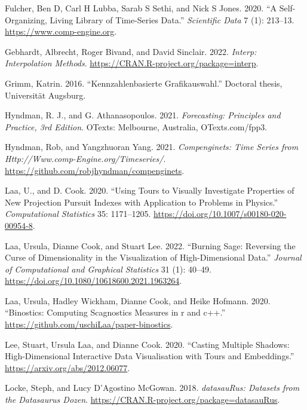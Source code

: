 \begin{CSLReferences}{1}{0}
\leavevmode{}%
Fulcher, Ben D, Carl H Lubba, Sarab S Sethi, and Nick S Jones. 2020. {``A Self-Organizing, Living Library of Time-Series Data.''} \emph{Scientific Data} 7 (1): 213--13. \url{https://www.comp-engine.org}.

\leavevmode{}%
Gebhardt, Albrecht, Roger Bivand, and David Sinclair. 2022. \emph{Interp: Interpolation Methods}. \url{https://CRAN.R-project.org/package=interp}.

\leavevmode{}%
Grimm, Katrin. 2016. {``Kennzahlenbasierte Grafikauswahl.''} Doctoral thesis, Universit{ä}t Augsburg.

\leavevmode{}%
Hyndman, R. J., and G. Athanasopoulos. 2021. \emph{Forecasting: Principles and Practice, 3rd Edition}. OTexts: Melbourne, Australia, OTexts.com/fpp3.

\leavevmode{}%
Hyndman, Rob, and Yangzhuoran Yang. 2021. \emph{Compenginets: Time Series from Http://Www.comp-Engine.org/Timeseries/}. \url{https://github.com/robjhyndman/compenginets}.

\leavevmode{}%
Laa, U., and D. Cook. 2020. {``Using Tours to Visually Investigate Properties of New Projection Pursuit Indexes with Application to Problems in Physics.''} \emph{Computational Statistics} 35: 1171--1205. \url{https://doi.org/10.1007/s00180-020-00954-8}.

\leavevmode{}%
Laa, Ursula, Dianne Cook, and Stuart Lee. 2022. {``Burning Sage: Reversing the Curse of Dimensionality in the Visualization of High-Dimensional Data.''} \emph{Journal of Computational and Graphical Statistics} 31 (1): 40--49. \url{https://doi.org/10.1080/10618600.2021.1963264}.

\leavevmode{}%
Laa, Ursula, Hadley Wickham, Dianne Cook, and Heike Hofmann. 2020. {``Binostics: Computing Scagnostics Measures in r and c++.''} \url{https://github.com/uschiLaa/paper-binostics}.

\leavevmode{}%
Lee, Stuart, Ursula Laa, and Dianne Cook. 2020. {``Casting Multiple Shadows: High-Dimensional Interactive Data Visualisation with Tours and Embeddings.''} \url{https://arxiv.org/abs/2012.06077}.

\leavevmode{}%
Locke, Steph, and Lucy D'Agostino McGowan. 2018. \emph{datasauRus: Datasets from the Datasaurus Dozen}. \url{https://CRAN.R-project.org/package=datasauRus}.


\end{CSLReferences}
